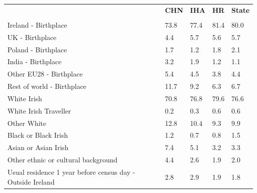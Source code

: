 \documentclass{article}
\begin{document}
\pagebreak
\begin{table}[h]	
\centering
		\begin{tabular}{KTTTT}
  \hline
& \textbf{CHN} & \textbf{IHA} & \textbf{HR}& \textbf{State}\\ 
  \hline
    \\ 
    \hline
Ireland - Birthplace & 73.8& 77.4& 81.4& 80.0\\
UK - Birthplace & 4.4& 5.7& 5.6& 5.7\\
Poland - Birthplace & 1.7& 1.2& 1.8& 2.1\\
India - Birthplace & 3.2& 1.9& 1.2& 1.1\\
Other EU28 - Birthplace & 5.4& 4.5& 3.8& 4.4\\
Rest of world - Birthplace & 11.7&  9.2&  6.3&  6.7\\
    \hline
White Irish & 70.8& 76.8& 79.6& 76.6\\
White Irish Traveller & 0.2& 0.3& 0.6& 0.6\\
Other White & 12.8& 10.4&  9.3&  9.9\\
Black or Black Irish & 1.2& 0.7& 0.8& 1.5\\
Asian or Asian Irish & 7.4& 5.1& 3.2& 3.3\\
Other ethnic or cultural background & 4.4& 2.6& 1.9& 2.0\\
    \hline
Usual residence 1 year before census day - Outside Ireland & 2.8& 2.9& 1.9& 1.8\\


\end{tabular}
\end{table}
\end{document}
